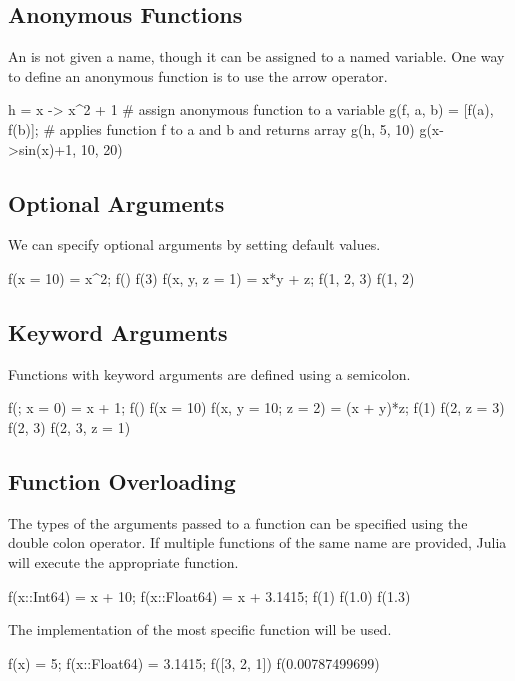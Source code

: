 \subsection{Anonymous Functions}

An  is not given a name, though it can be assigned to a named variable. One way to define an anonymous function is to use the arrow operator.
\begin{juliaconsole}[anonfun]
h = x -> x^2 + 1 # assign anonymous function to a variable
g(f, a, b) = [f(a), f(b)]; # applies function f to a and b and returns array
g(h, 5, 10)
g(x->sin(x)+1, 10, 20)
\end{juliaconsole}

\subsection{Optional Arguments}

We can specify optional arguments by setting default values.
\begin{juliaconsole}[optarg]
f(x = 10) = x^2;
f()
f(3)
f(x, y, z = 1) = x*y + z;
f(1, 2, 3)
f(1, 2)
\end{juliaconsole}

\subsection{Keyword Arguments}

Functions with keyword arguments are defined using a semicolon.
\begin{juliaconsole}[keywordarg]
f(; x = 0) = x + 1;
f()
f(x = 10)
f(x, y = 10; z = 2) = (x + y)*z;
f(1)
f(2, z = 3)
f(2, 3)
f(2, 3, z = 1)
\end{juliaconsole}

\subsection{Function Overloading}
\label{sec:operation_overloading}

The types of the arguments passed to a function can be specified using the double colon operator. If multiple functions of the same name are provided, Julia will execute the appropriate function.
\begin{juliaconsole}[overloading]
f(x::Int64) = x + 10;
f(x::Float64) = x + 3.1415;
f(1)
f(1.0)
f(1.3)
\end{juliaconsole}

The implementation of the most specific function will be used.
\begin{juliaconsole}[overloading]
f(x) = 5;
f(x::Float64) = 3.1415;
f([3, 2, 1])
f(0.00787499699)
\end{juliaconsole}


